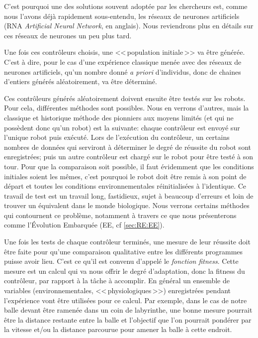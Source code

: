 \begin{inparaenum}[(\itshape 1\upshape)]
   C'est pourquoi une des solutions souvent adoptée par les chercheurs est, comme nous l'avons déjà rapidement sous-entendu, les réseaux de neurones artificiels (RNA \emph  {Artificial Neural Network},  en anglais). Nous reviendrons plus en détails sur ces réseaux de neurones un peu plus tard. \label{it:RNA}

  \item  Une fois ces contrôleurs choisis,  une <<\,population initiale\,>> va être générée. C'est à dire, pour le cas d'une expérience classique menée avec des réseaux de neurones artificiels, qu'un nombre donné \emph{a priori} d'individus,  donc de chaines d'entiers générés aléatoirement, va être déterminé.

 \item Ces contrôleurs générés aléatoirement doivent ensuite être testés sur les robots. Pour cela, différentes méthodes sont possibles. Nous en verrons d'autres, mais la classique et historique méthode des pionniers aux moyens limités (et qui ne possèdent donc qu'un robot) est la suivante: chaque contrôleur est envoyé sur l'unique robot puis exécuté. Lors de l'exécution du contrôleur, un certains nombres de données qui serviront à déterminer le degré de réussite du robot sont enregistrées; puis un autre contrôleur est chargé sur le robot pour être testé à son tour. Pour que la comparaison soit possible, il faut évidemment que les conditions initiales soient les mêmes, c'est pourquoi le robot doit être remis à son point de départ et toutes les conditions environnementales réinitialisées à l'identique. Ce travail de test est un travail long, fastidieux, sujet à beaucoup d'erreurs et loin de trouver un équivalent dans le monde biologique. Nous verrons certains méthodes qui contournent ce problème, notamment à travers ce que nous présenterons comme l'Évolution Embarquée (EE, cf \ref{sec:RE:EE}). \label{it:test}

  \item Une fois les tests de chaque contrôleur terminés, une mesure de leur réussite doit être faite pour qu'une comparaison qualitative entre les différents programmes puisse avoir lieu. C'est ce qu'il est convenu d'appelé le \emph{fonction fitness}.  Cette mesure est un calcul qui va nous offrir le degré d'adaptation, donc la fitness du contrôleur, par rapport à la tâche à accomplir. En général un ensemble de variables (environnementales, <<\,physiologiques\,>>) enregistrées pendant l'expérience vont être utilisées pour ce calcul. Par exemple, dans le cas de notre balle devant être ramenée dans un coin de labyrinthe, une bonne mesure pourrait être la distance restante entre la balle et l'objectif que l'on pourrait pondérer par la vitesse et/ou la distance parcourue pour amener la balle à cette endroit.


\end{inparaenum}
